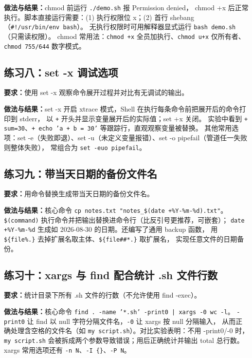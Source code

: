 \documentclass[UTF8]{ctexart}
\begin{document}
\noindent\textbf{做法与结果：}chmod 前运行 \texttt{./demo.sh} 报 Permission denied，
chmod +x 后正常执行。脚本直接运行需要：(1) 执行权限位 x；(2) 首行 shebang（\texttt{\#!/usr/bin/env bash}）。
无执行权限时可用解释器显式运行 \texttt{bash demo.sh}（只需读权限）。
chmod 常用法：\texttt{chmod +x} 全员加执行、\texttt{chmod u+x} 仅所有者、\texttt{chmod 755/644} 数字模式。

\subsection{练习八：set -x 调试选项}

\noindent\textbf{要求：}使用 set -x 观察命令展开过程并对比有无调试的输出。

\noindent\textbf{做法与结果：}set -x 开启 xtrace 模式，Shell 在执行每条命令前把展开后的命令打印到 stderr，
以 \texttt{+} 开头并显示变量展开后的实际值；set +x 关闭。
实验中看到 \texttt{+ sum=30}、\texttt{+ echo 'a + b = 30'} 等跟踪行，直观观察变量被替换。
其他常用选项：set -e（失败即退）、set -u（未定义变量报错）、set -o pipefail（管道任一失败则整体失败），
常组合为 \texttt{set -euo pipefail}。

\subsection{练习九：带当天日期的备份文件名}

\noindent\textbf{要求：}用命令替换生成带当天日期的备份文件名。

\noindent\textbf{做法与结果：}核心命令 \texttt{cp notes.txt "notes\_\$(date +\%Y-\%m-\%d).txt"}。
\texttt{\$(command)} 执行命令并把输出替换进命令行（比反引号更推荐，可嵌套）；
\texttt{date +\%Y-\%m-\%d} 生成如 2026-08-30 的日期。还编写了通用 backup 函数，
用 \texttt{\$\{file\%.\*\}} 去掉扩展名取主体、\texttt{\$\{file\#\#*.\}} 取扩展名，
实现任意文件的日期备份。

\subsection{练习十：xargs 与 find 配合统计 .sh 文件行数}

\noindent\textbf{要求：}统计目录下所有 .sh 文件的行数（不允许使用 find -exec）。

\noindent\textbf{做法与结果：}核心命令 \texttt{find . -name '*.sh' -print0 | xargs -0 wc -l}。
\texttt{-print0} 让 find 以 null 字符分隔文件名，\texttt{-0} 让 xargs 按 null 分隔输入，
从而正确处理含空格的文件名（如 \texttt{my script.sh}）。对比实验表明：不用 -print0/-0 时，
\texttt{my script.sh} 会被拆成两个参数导致错误；用后正确统计并输出 total 总行数。
xargs 常用选项还有 \texttt{-n N}、\texttt{-I \{\}}、\texttt{-P N}。
\end{document}
